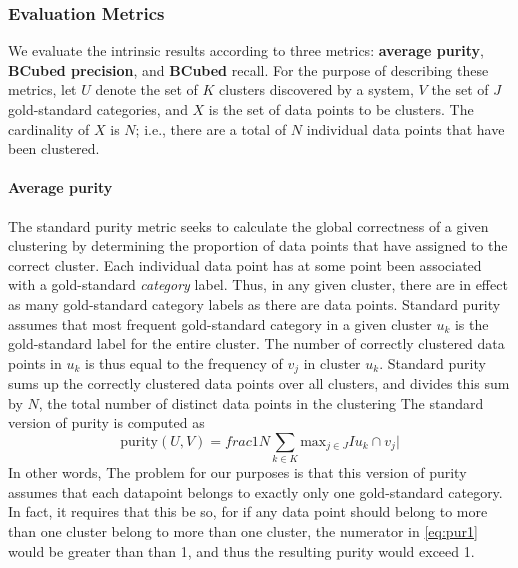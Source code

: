 \subsubsection{Evaluation Metrics} 
\label{sec:metrics}
We evaluate the intrinsic results according to three metrics: \textbf{average purity}, \textbf{BCubed precision}, and
 \textbf{BCubed} recall. For the purpose of describing these metrics,
 let $U$ denote the set of $K$ clusters discovered by a system, $V$ the set of $J$ gold-standard categories, and $X$ is the set of data points to be clusters. The cardinality of $X$ is $N$; i.e., there are a total of $N$ individual data points that have been clustered.
\paragraph{Average purity}
The standard purity metric seeks to calculate the global correctness of a given clustering by determining the proportion of data points that have assigned to the correct cluster. Each individual data point has at some point been associated with a gold-standard \emph{category} label. Thus, in any given cluster, there are in effect as many gold-standard category labels as there are data points. Standard purity assumes that most frequent 
 gold-standard category in a given cluster $u_k$ is the gold-standard label for the entire cluster. The number of correctly clustered data points in $u_k$ is thus equal to the frequency of  $v_j$ in cluster $u_k$. Standard purity sums up the correctly clustered data points over all clusters, and divides this sum by $N$, the total number of distinct data points in the clustering
 The standard version of purity is computed as 
\begin{equation} \label{eq:pur1}
\text{purity}(U, V) = frac{1}{N} \sum_{k \in K} \text{max}_{j \in J} I u_k \cap v_j|
\end{equation}
In other words, 
The problem for our purposes is that this version of purity assumes that each datapoint belongs to exactly only one gold-standard category. In fact, it requires that this be so, for if any data point should belong to more than one cluster belong to more than one cluster, the numerator in \eqref{eq:pur1} would be greater than than 1, and thus the resulting purity would exceed 1.
